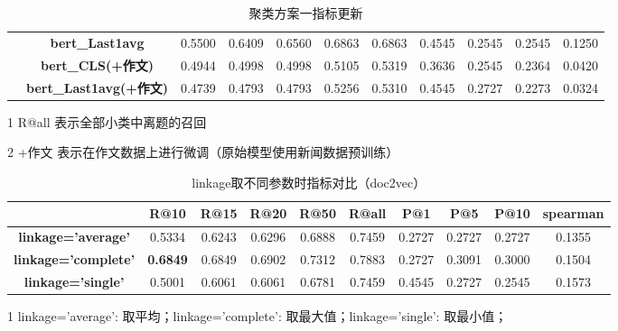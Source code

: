 \documentclass[11pt]{article}
\begin{document}
\begin{CJK}{UTF8}{gkai}
\begin{table}[htbp]
\begin{tabular}{c|c|c|c|c|c|c|c|c|c|c}
      & \textbf{bert\_Last1avg} & 0.5500  & 0.6409  & 0.6560  & 0.6863  & 0.6863  & 0.4545  & 0.2545  & 0.2545  & 0.1250  \\
      & \textbf{bert\_CLS(+作文)} & 0.4944  & 0.4998  & 0.4998  & 0.5105  & 0.5319  & 0.3636  & 0.2545  & 0.2364  & 0.0420  \\
      & \textbf{bert\_Last1avg(+作文)} & 0.4739  & 0.4793  & 0.4793  & 0.5256  & 0.5310  & 0.4545  & 0.2727  & 0.2273  & 0.0324  \\
      \hline
    \end{tabular}%
    \begin{tablenotes}    %
      \footnotesize               %
      \item[1] R@all 表示全部小类中离题的召回
      \item[2] +作文 表示在作文数据上进行微调（原始模型使用新闻数据预训练） 
    \end{tablenotes} 
  \caption{聚类方案一指标更新}
  \label{tab:addlabel}%
\end{table}%


\begin{table}[htbp]\small
  \centering
    \begin{tabular}{c|c|c|c|c|c|c|c|c|c}
      \hline
      \textcolor[rgb]{ 1,  0,  0}{} & \multicolumn{1}{c}{\textbf{R@10}} & \multicolumn{1}{c}{\textbf{R@15}} & \multicolumn{1}{c}{\textbf{R@20}} & \multicolumn{1}{c}{\textbf{R@50}} & \multicolumn{1}{c}{\textbf{R@all}} & \multicolumn{1}{c}{\textbf{P@1}} & \multicolumn{1}{c}{\textbf{P@5}} & \multicolumn{1}{c}{\textbf{P@10}} & \multicolumn{1}{c}{\textbf{spearman}} \\
      \hline
      \textbf{linkage='average'} & 0.5334  & 0.6243  & 0.6296  & 0.6888  & 0.7459  & 0.2727  & 0.2727  & 0.2727  & 0.1355  \\
      \hline
      \textbf{linkage='complete'} & \textcolor[rgb]{ 1,  0,  0}{\textbf{0.6849 }} & 0.6849  & 0.6902  & 0.7312  & 0.7883  & 0.2727  & 0.3091  & 0.3000  & 0.1504  \\
      \hline
      \textbf{linkage='single'} & 0.5001  & 0.6061  & 0.6061  & 0.6781  & 0.7459  & 0.4545  & 0.2727  & 0.2545  & 0.1573  \\
      \hline
    \end{tabular}%
    \begin{tablenotes}
      \item[1] linkage='average': 取平均；linkage='complete': 取最大值；linkage='single': 取最小值；
    \end{tablenotes}
    \caption{linkage取不同参数时指标对比（doc2vec）}
  \label{tab:addlabel}%
\end{table}%



\end{CJK}
\end{document}
